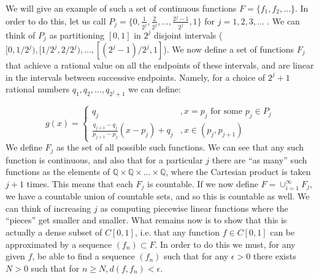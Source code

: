 \begin{solution}

    We will give an example of such a set of continuous functions $F = \{f_1, f_2, \ldots\}$.
    In order to do this, let us call $P_j = \{0, \frac{1}{2^j}, \frac{2}{2^j}, \ldots, \frac{2^j - 1}{2^j}, 1\}$ for $j= 1, 2, 3, \ldots$ .
    We can think of $P_j$ as partitioning $[0, 1]$ in $2^j$ disjoint intervals ($[0, 1/2^j), [1/2^j, 2/2^j), \ldots, [(2^j - 1)/2^j, 1]$).
    We now define a set of functions $F_j$ that achieve a rational value on all the endpoints of these intervals, and are linear in the intervals between successive endpoints.
    Namely, for a choice of $2^j + 1$ rational numbers $q_1, q_2, \ldots, q_{2^j + 1}$ we can define:

    $$g(x) = \begin{cases}
        q_j &, x = p_j \text{ for some } p_j \in P_j \\
        \frac{q_{j+1} - q_j}{p_{j+1} - p_j}(x - p_j) + q_j &, x \in (p_{j}, p_{j+1})
    \end{cases}$$
    We define $F_j$ as the set of all possible such functions.
    We can see that any such function is continuous, and also that for a particular $j$ there are ``as many'' such functions as the elements of $\mathbb{Q} \times \mathbb{Q} \times \ldots \times \mathbb{Q}$, where the Cartesian product is taken $j + 1$ times.
    This means that each $F_j$ is countable.
    If we now define $F = \cup_{i=1}^{\infty} F_j$, we have
    a countable union of countable sets, and so this is countable as well.
    We can think of increasing $j$ as computing piecewise linear functions where the ``pieces'' get smaller and smaller.
    What remains now is to show that this is actually a dense subset of $C[0, 1]$, i.e. that any function $f \in C[0,1]$ can be approximated by a sequence $(f_n) \subset F$.
    In order to do this we must, for any given $f$, be able to find a sequence $(f_n)$ such that for any $\epsilon > 0$ there exists $N > 0$ such that for $n \geq N, d(f, f_n) < \epsilon$.


\end{solution}
